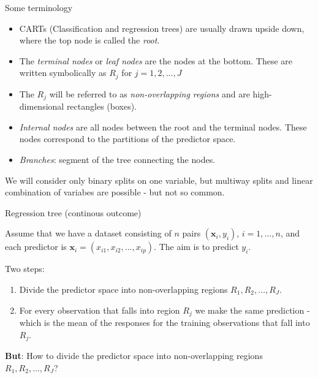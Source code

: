 \documentclass[10pt,ignorenonframetext,]{beamer}
\begin{document}
\begin{frame}

\begin{block}{Some terminology}

\begin{itemize}
\item
  CARTs (Classification and regression trees) are usually drawn upside
  down, where the top node is called the \emph{root}.
\item
  The \emph{terminal nodes} or \emph{leaf nodes} are the nodes at the
  bottom. These are written symbolically as \(R_j\) for
  \(j = 1, 2, ..., J\)
\item
  The \(R_j\) will be referred to as \emph{non-overlapping regions} and
  are high-dimensional rectangles (boxes).
\item
  \emph{Internal nodes} are all nodes between the root and the terminal
  nodes. These nodes correspond to the partitions of the predictor
  space.
\item
  \emph{Branches}: segment of the tree connecting the nodes.
\end{itemize}

\vspace{2mm} We will consider only binary splits on one variable, but
multiway splits and linear combination of variabes are possible - but
not so common.

\end{block}

\end{frame}

\begin{frame}{Regression tree (continous outcome)}

Assume that we have a dataset consisting of \(n\) pairs
\((\boldsymbol{x}_i,y_i)\), \(i=1,\ldots,n\), and each predictor is
\({\boldsymbol{x}}_i=(x_{i1},x_{i2},...,x_{ip})\). The aim is to predict
\(y_i\).

\vspace{2mm} Two steps:

\begin{enumerate}
\def\labelenumi{\arabic{enumi}.}
\item
  Divide the predictor space into non-overlapping regions
  \(R_1,R_2,\ldots,R_J\).
\item
  For every observation that falls into region \(R_j\) we make the same
  prediction - which is the mean of the responses for the training
  observations that fall into \(R_j\).
\end{enumerate}

\vspace{2mm}

\textbf{But}: How to divide the predictor space into non-overlapping
regions \(R_1,R_2,\ldots,R_J\)?

\end{frame}
\end{document}
